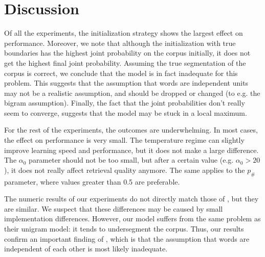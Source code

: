 \section{Discussion}

Of all the experiments, the initialization strategy shows the largest effect on performance. Moreover, we note that although the initialization with true boundaries has the highest joint probability on the corpus initially, it does not get the highest final joint probability. Assuming the true segmentation of the corpus is correct, we conclude that the model is in fact inadequate for this problem. This suggests that the assumption that words are independent units may not be a realistic assumption, and should be dropped or changed (to e.g. the bigram assumption). Finally, the fact that the joint probabilities don't really seem to converge, suggests that the model may be stuck in a local maximum.

For the rest of the experiments, the outcomes are underwhelming. In most cases, the effect on performance is very small. The temperature regime can slightly improve learning speed and performance, but it does not make a large difference. The $\alpha_0$ parameter should not be too small, but after a certain value (e.g. $\alpha_0 > 20$), it does not really affect retrieval quality anymore. The same applies to the $p_\#$ parameter, where values greater than 0.5 are preferable.

The numeric results of our experiments do not directly match those of \cite{Goldwater200921}, but they are similar. We suspect that these differences may be caused by small implementation differences. However, our model suffers from the same problem as their unigram model: it tends to undersegment the corpus. Thus, our results confirm an important finding of \cite{Goldwater200921}, which is that the assumption that words are independent of each other is most likely inadequate.

